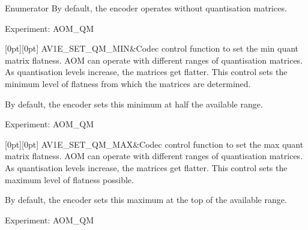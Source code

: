 \begin{DoxyEnumFields}{Enumerator}
By default, the encoder operates without quantisation matrices.

Experiment\+: A\+O\+M\+\_\+\+QM \\
\hline

[0pt][0pt]{}\mbox{\label{group__aom__encoder_ggae78dde67a6d78f332e9bdba0dde42db5ae611944ba148b6446d4387dd9b452917}} 
A\+V1\+E\+\_\+\+S\+E\+T\+\_\+\+Q\+M\+\_\+\+M\+IN&Codec control function to set the min quant matrix flatness. A\+OM can operate with different ranges of quantisation matrices. As quantisation levels increase, the matrices get flatter. This control sets the minimum level of flatness from which the matrices are determined.

By default, the encoder sets this minimum at half the available range.

Experiment\+: A\+O\+M\+\_\+\+QM \\
\hline

[0pt][0pt]{}\mbox{\label{group__aom__encoder_ggae78dde67a6d78f332e9bdba0dde42db5ad897674e1b68b24ec14a01a4e3edacc7}} 
A\+V1\+E\+\_\+\+S\+E\+T\+\_\+\+Q\+M\+\_\+\+M\+AX&Codec control function to set the max quant matrix flatness. A\+OM can operate with different ranges of quantisation matrices. As quantisation levels increase, the matrices get flatter. This control sets the maximum level of flatness possible.

By default, the encoder sets this maximum at the top of the available range.

Experiment\+: A\+O\+M\+\_\+\+QM \\
\hline


\end{DoxyEnumFields}

